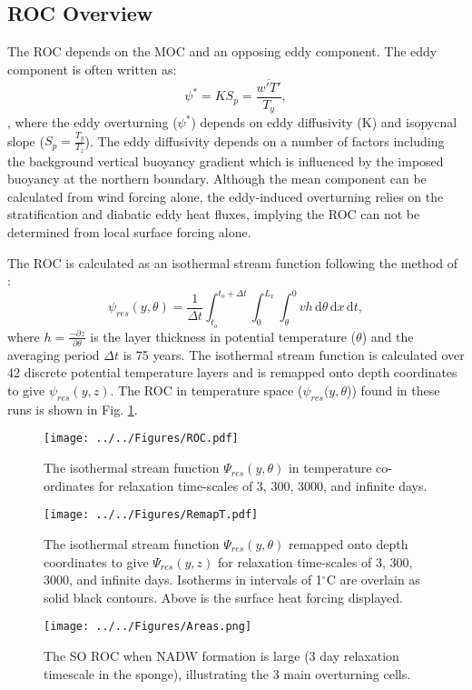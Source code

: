 \subsection{ROC Overview}
The ROC depends on the MOC and an opposing eddy component. The eddy component is often written as:
\begin{equation}
\psi ^* = KS_p = \frac{\overline{w'T'}}{T_{y}},
\label{eq:edpsi}
\end{equation}
\citep{Held1999},
where the eddy overturning ($\psi ^*$) depends on eddy diffusivity (K) and isopycnal slope ($\displaystyle{S_p= \frac{T_y}{T_z}}$). The eddy diffusivity depends on a number of factors including the background vertical buoyancy gradient \citep{Ferreira2005} which is influenced by the imposed buoyancy at the northern boundary. Although the mean component can be calculated from wind forcing alone, the eddy-induced overturning relies on the stratification and diabatic eddy heat fluxes, implying the ROC can not be determined from local surface forcing alone. 

The ROC is calculated as an isothermal stream function following the method of \citet{Abernathey2011}:
\begin{equation}
\psi_{res}(y, \theta)= \frac{1}{\Delta t} \int_{t_o}^{t_{o}+\Delta t} \int_{0}^{L_x}  \int_{\theta}^{0} vh \,\mathrm{d}\theta \,\mathrm{d}x\,\mathrm{d}t,
\label{EQ:psidense} 
\end{equation} 
where $\displaystyle{h = \frac{-\partial z}{\partial \theta}}$ is the layer thickness in potential temperature ($\theta$) and the averaging period $\Delta t$ is 75 years. The isothermal stream function is calculated over 42 discrete potential temperature layers and is remapped onto depth coordinates to give $\psi_{res}(y,z)$. The ROC in temperature space ($\psi_{res}(y,\theta$)) found in these runs is shown in Fig. \ref{fig:ROCT}.
\begin{figure}
\noindent \texttt{[image: ../../Figures/ROC.pdf]} 
\caption{The isothermal stream function $\Psi_{res}(y,\theta)$ in temperature co-ordinates for relaxation time-scales of 3, 300, 3000, and infinite days.}
\label{fig:ROCT}
\end{figure}
\begin{figure}
\noindent \texttt{[image: ../../Figures/RemapT.pdf]} 
\caption{The isothermal stream function $\Psi_{res}(y,\theta)$ remapped onto depth coordinates to give $\Psi_{res}(y,z)$ for relaxation time-scales of 3, 300, 3000, and infinite days. Isotherms in intervals of 1$^{\circ}$C are overlain as solid black contours. Above is the surface heat forcing displayed.}
\label{fig:Remap}
\end{figure}
\begin{figure}
 \noindent \texttt{[image: ../../Figures/Areas.png]} 
\caption{The SO ROC when NADW formation is large (3 day relaxation timescale in the sponge), illustrating the 3 main overturning cells.}
\label{fig:Areas}
\end{figure}

